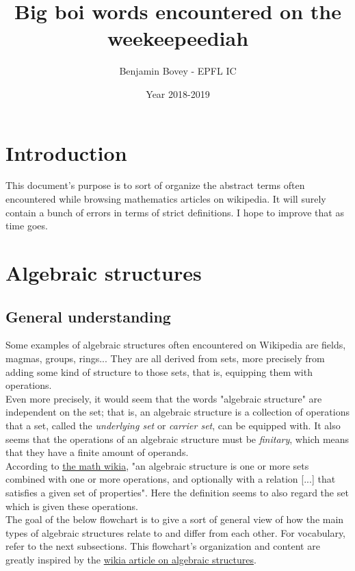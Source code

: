\documentclass{article}
\title{Big boi words encountered on the weekeepeediah}
\author{Benjamin Bovey - EPFL IC}
\date{Year 2018-2019}
\begin{document}
\maketitle
\section*{Introduction}
This document's purpose is to sort of organize the abstract terms often encountered while browsing mathematics articles on wikipedia. It will surely contain a bunch of errors in terms of strict definitions. I hope to improve that as time goes.

\section{Algebraic structures}
\subsection{General understanding}
Some examples of algebraic structures often encountered on Wikipedia are fields, magmas, groups, rings... They are all derived from sets, more precisely from adding some kind of structure to those sets, that is, equipping them with operations. \\
Even more precisely, it would seem that the words "algebraic structure" are independent on the set; that is, an algebraic structure is a collection of operations that a set, called the \emph{underlying set} or \emph{carrier set}, can be equipped with. It also seems that the operations of an algebraic structure must be \emph{finitary}, which means that they have a finite amount of operands. \\
According to \href{http://math.wikia.com/wiki/Algebraic_structure}{the math wikia}, "an algebraic structure is one or more sets combined with one or more operations, and optionally with a relation [...] that satisfies a given set of properties". Here the definition seems to also regard the set which is given these operations. \\

The goal of the below flowchart is to give a sort of general view of how the main types of algebraic structures relate to and differ from each other. For vocabulary, refer to the next subsections. This flowchart's organization and content are greatly inspired by the \href{http://math.wikia.com/wiki/Algebraic_structure}{wikia article on algebraic structures}.
\end{document}
